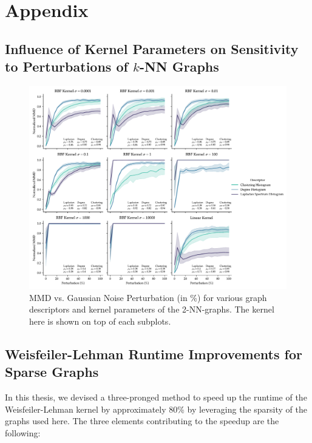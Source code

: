 \chapter{Appendix}
\vspace{12pt}
\section{Influence of Kernel Parameters on Sensitivity to Perturbations of $k$-NN Graphs}

\begin{figure}[h]
  \centering
  \includegraphics[width=\textwidth]{./figures/results/res_1_5.pdf}
  \caption[MMD vs. Gaussian Noise Perturbation (in \%) for various graph
descriptors of the 2-NN-graphs.]{MMD vs. Gaussian Noise Perturbation (in \%) for
various graph descriptors and kernel parameters of the 2-NN-graphs. The kernel
here is shown on top of each subplots.}
  \label{fig:mmd_effect_kernel_knn}
\end{figure}


\section{Weisfeiler-Lehman Runtime Improvements for Sparse
  Graphs}\label{sec:sparse_wl}

In this thesis, we devised a three-pronged method to speed up the runtime of the
Weisfeiler-Lehman kernel by approximately 80\% by leveraging the sparsity of the
graphs used here. The three elements contributing to the speedup are the
following:

